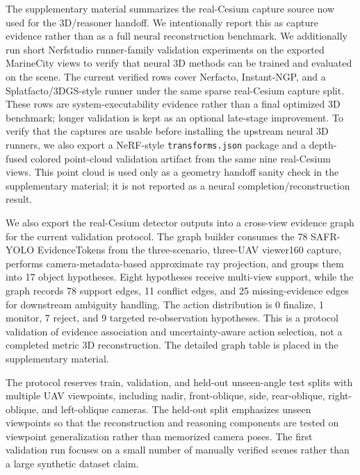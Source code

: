 The supplementary material summarizes the real-Cesium capture source now used
for the 3D/reasoner handoff. We intentionally report this as capture evidence
rather than as a full neural reconstruction benchmark. We additionally run
short Nerfstudio runner-family validation experiments
on the exported MarineCity views to verify that neural 3D methods can be
trained and evaluated on the scene. The current verified rows cover Nerfacto,
Instant-NGP, and a Splatfacto/3DGS-style runner under the same sparse
real-Cesium capture split. These rows are system-executability evidence rather
than a final optimized 3D benchmark; longer validation is kept as an optional
late-stage improvement.
To verify that the captures are usable before installing the upstream neural
3D runners, we also export a NeRF-style \texttt{transforms.json} package and a
depth-fused colored point-cloud validation artifact from the same nine
real-Cesium views. This point cloud is used only as a geometry handoff sanity
check in the supplementary material; it is not reported as a neural
completion/reconstruction result.

We also export the real-Cesium detector outputs into a cross-view evidence graph
for the current validation protocol. The graph builder consumes the 78 SAFR-YOLO
EvidenceTokens from the three-scenario, three-UAV viewer160 capture, performs
camera-metadata-based approximate ray projection, and groups them into 17
object hypotheses. Eight hypotheses receive multi-view support, while the graph
records 78 support edges, 11 conflict edges, and 25 missing-evidence edges for
downstream ambiguity handling. The action distribution is 0 finalize, 1
monitor, 7 reject, and 9 targeted re-observation hypotheses. This is a protocol
validation of evidence association and uncertainty-aware action selection, not a completed
metric 3D reconstruction. The detailed graph table is placed in the
supplementary material.

The protocol reserves train, validation, and held-out unseen-angle test splits
with multiple UAV viewpoints, including nadir, front-oblique, side, rear-oblique,
right-oblique, and left-oblique cameras. The held-out split emphasizes
unseen viewpoints so that the reconstruction and reasoning components are tested
on viewpoint generalization rather than memorized camera poses. The first
validation run focuses on a small number of manually verified scenes rather than a
large synthetic dataset claim.

